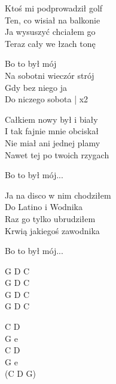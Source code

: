 \begin{text}
    Ktoś mi podprowadził golf\\
    Ten, co wisiał na balkonie\\
    Ja wysuszyć chciałem go\\
    Teraz cały we łzach tonę

    \vin Bo to był mój\\			
    \vin Na sobotni wieczór strój\\
    \vin Gdy bez niego ja\\
    \vin Do niczego sobota		| x2
				
    Całkiem nowy był i biały\\
    I tak fajnie mnie obciskał\\
    Nie miał ani jednej plamy\\
    Nawet tej po twoich rzygach

    \vin Bo to był mój...

    Ja na disco w nim chodziłem\\
    Do Latino i Wodnika\\
    Raz go tylko ubrudziłem\\
    Krwią jakiegoś zawodnika

    \vin Bo to był mój...

	
\end{text}
\begin{chord}
    G D C\\
    G D C\\
    G D C\\
    G D C

    C D\\
    G e\\
	C D\\
	G e\\
    (C D G)
\end{chord}
